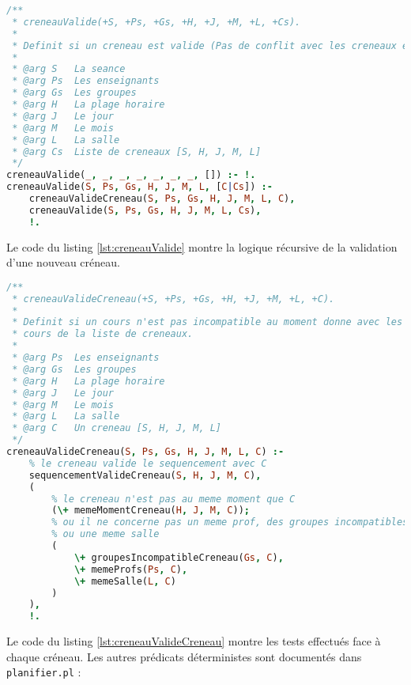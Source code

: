 \begin{lstlisting}[language=Prolog, caption=creneauValide, captionpos=b,
label={lst:creneauValide}]
/**
 * creneauValide(+S, +Ps, +Gs, +H, +J, +M, +L, +Cs).
 *
 * Definit si un creneau est valide (Pas de conflit avec les creneaux existants)
 *
 * @arg S   La seance
 * @arg Ps  Les enseignants
 * @arg Gs  Les groupes
 * @arg H   La plage horaire
 * @arg J   Le jour
 * @arg M   Le mois
 * @arg L   La salle
 * @arg Cs  Liste de creneaux [S, H, J, M, L]
 */
creneauValide(_, _, _, _, _, _, _, []) :- !.
creneauValide(S, Ps, Gs, H, J, M, L, [C|Cs]) :-
    creneauValideCreneau(S, Ps, Gs, H, J, M, L, C),
    creneauValide(S, Ps, Gs, H, J, M, L, Cs),
    !.
\end{lstlisting}

Le code du listing \ref{lst:creneauValide} montre la logique récursive de la
validation d'une nouveau créneau.

\begin{lstlisting}[language=Prolog, caption=creneauValideCreneau, captionpos=b,
label={lst:creneauValideCreneau}]
/**
 * creneauValideCreneau(+S, +Ps, +Gs, +H, +J, +M, +L, +C).
 *
 * Definit si un cours n'est pas incompatible au moment donne avec les autres
 * cours de la liste de creneaux.
 *
 * @arg Ps  Les enseignants
 * @arg Gs  Les groupes
 * @arg H   La plage horaire
 * @arg J   Le jour
 * @arg M   Le mois
 * @arg L   La salle
 * @arg C   Un creneau [S, H, J, M, L]
 */
creneauValideCreneau(S, Ps, Gs, H, J, M, L, C) :-
    % le creneau valide le sequencement avec C
    sequencementValideCreneau(S, H, J, M, C),
    (
        % le creneau n'est pas au meme moment que C
        (\+ memeMomentCreneau(H, J, M, C));
        % ou il ne concerne pas un meme prof, des groupes incompatibles
        % ou une meme salle
        (
            \+ groupesIncompatibleCreneau(Gs, C),
            \+ memeProfs(Ps, C),
            \+ memeSalle(L, C)
        )
    ),
    !.
\end{lstlisting}

Le code du listing \ref{lst:creneauValideCreneau} montre les tests effectués
face à chaque créneau. Les autres prédicats déterministes sont documentés dans
\texttt{planifier.pl} :

